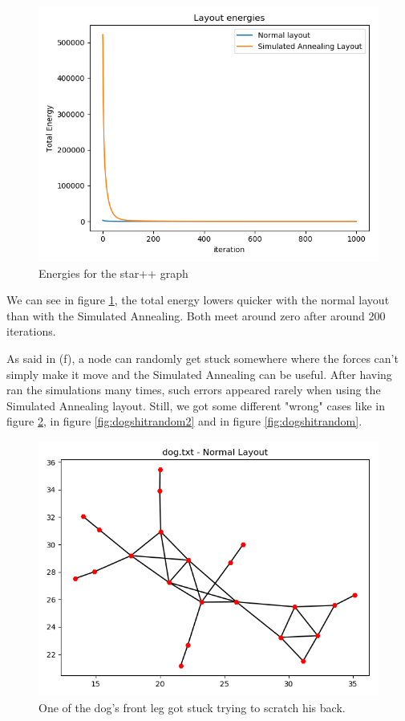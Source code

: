 \documentclass[10pt,a4paper]{article}
\begin{document}
\begin{enumerate}
\begin{figure}[H]
	\centering
	\includegraphics[width=0.7\linewidth]{../Scripts/star++_energies}
	\caption{Energies for the star++ graph}
	\label{fig:starenergies}
\end{figure}

We can see in figure \ref{fig:starenergies}, the total energy lowers quicker with the normal layout than with the Simulated Annealing. Both meet around zero after around 200 iterations. 


As said in (f), a node can randomly get stuck somewhere where the forces can't simply make it move and the Simulated Annealing can be useful. After having ran the simulations many times, such errors appeared rarely when using the Simulated Annealing layout. Still, we got some different "wrong" cases like in figure \ref{fig:dognormalerror}, in figure \ref{fig:dogshitrandom2} and in figure \ref{fig:dogshitrandom}.

\begin{figure}[H]
	\centering
	\includegraphics[width=0.7\linewidth]{../Scripts/dog_normal_error}
	\caption{One of the dog's front leg got stuck trying to scratch his back. }
	\label{fig:dognormalerror}
\end{figure}



\end{enumerate}
\end{document}
